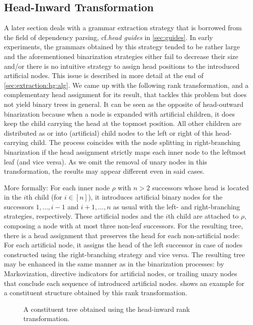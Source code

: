 \documentclass[../../document.tex]{subfiles}
\begin{document}
    \subsection{Head-Inward Transformation} \label{sec:extraction:bin:hi}
    A later section deals with a grammar extraction strategy that is borrowed from the field of dependency parsing, cf.\@ \emph{head guides} in \cref{sec:guides}.
    In early experiments, the grammars obtained by this strategy tended to be rather large and the aforementioned binarization strategies either fail to decrease their size and/or there is no intuitive strategy to assign head positions to the introduced artificial nodes.
    This issue is described in more detail at the end of \cref{sec:extraction:hg:alg}.
    We came up with the following rank transformation, and a complementary head assignment for its result, that tackles this problem but does not yield binary trees in general.
    It can be seen as the opposite of head-outward binarization because when a node is expanded with artificial children, it does keep the child carrying the head at the topmost position.
    All other children are distributed as or into (artificial) child nodes to the left or right of this head-carrying child.
    The process coincides with the node splitting in right-branching binarization if the head assignment strictly maps each inner node to the leftmost leaf (and vice versa).
    As we omit the removal of unary nodes in this transformation, the results may appear different even in said cases.

    More formally: For each inner node \(\rho\) with \(n > 2\) successors whose head is located in the \(i\)th child (for \(i \in [n]\)), it introduces artificial binary nodes for the successors \(1, \ldots, i-1\) and \(i+1, \ldots, n\) as usual with the left- and right-branching strategies, respectively.
    These artificial nodes and the \(i\)th child are attached to \(\rho\), composing a node with at most three non-leaf successors.
    For the resulting tree, there is a head assignment that preserves the head for each non-artificial node:
        For each artificial node, it assigns the head of the left successor in case of nodes constructed using the right-branching strategy and vice versa.
    The resulting tree may be enhanced in the same manner as in the binarization processes: by Markovization, directive indicators for artificial nodes, or trailing unary nodes that conclude each sequence of introduced artificial nodes.
     shows an example for a constituent structure obtained by this rank transformation.

    \begin{figure}
        \centering
        
        \caption{\label{fig:ex:head-inward}
            A constituent tree obtained using the head-inward rank transformation.
        }
    \end{figure}
\end{document}
